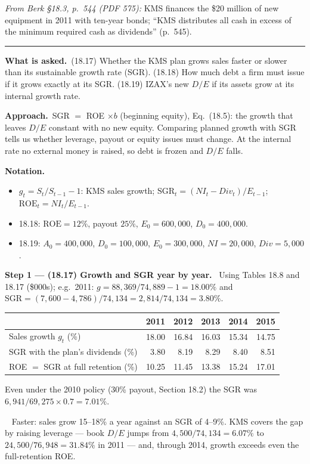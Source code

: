 \documentclass[11pt,a4paper]{article}
\newcommand{\notation}{\par\noindent\textbf{Notation.}}
\newcommand{\step}[2]{\par\medskip\noindent\textbf{Step #1 --- #2.}~}
\newcommand{\asked}{\par\medskip\noindent\textbf{What is asked.}~}
\newcommand{\approach}{\par\smallskip\noindent\textbf{Approach.}~}
\newcommand{\answer}[1]{\par\smallskip\noindent\fbox{\textbf{Answer #1.}}~}
\newcommand{\stmtend}{\par\endgroup\nopagebreak\noindent\rule{\linewidth}{0.4pt}\par\medskip}
\begin{document}
\emph{From Berk §18.3, p.~544 (PDF 575):} KMS finances the \$20 million of new equipment in 2011
with ten-year bonds; ``KMS distributes all cash in excess of the minimum required cash as
dividends'' (p.~545).
\stmtend

\asked (18.17) Whether the KMS plan grows sales faster or slower than its sustainable growth rate (SGR).
(18.18) How much debt a firm must issue if it grows exactly at its SGR. (18.19) IZAX's new $D/E$ if its
assets grow at its internal growth rate.

\approach SGR $=$ ROE $\times b$ (beginning equity), Eq.~(18.5): the growth that leaves $D/E$ constant
with no new equity. Comparing planned growth with SGR tells us whether leverage, payout or equity issues
must change. At the internal rate no external money is raised, so debt is frozen and $D/E$ falls.

\notation
\begin{itemize}
  \item $g_t=S_t/S_{t-1}-1$: KMS sales growth; $\text{SGR}_t=(NI_t-Div_t)/E_{t-1}$; $\text{ROE}_t=NI_t/E_{t-1}$.
  \item 18.18: $\text{ROE}=12\%$, payout $25\%$, $E_0=600{,}000$, $D_0=400{,}000$.
  \item 18.19: $A_0=400{,}000$, $D_0=100{,}000$, $E_0=300{,}000$, $NI=20{,}000$, $Div=5{,}000$.
\end{itemize}

\step{1}{(18.17) Growth and SGR year by year} Using Tables 18.8 and 18.17 (\$000s); e.g.\ 2011:
$g=88{,}369/74{,}889-1=18.00\%$ and $\text{SGR}=(7{,}600-4{,}786)/74{,}134=2{,}814/74{,}134=3.80\%$.
\begin{center}\small
\begin{tabular}{lrrrrr}
\toprule
 & 2011 & 2012 & 2013 & 2014 & 2015\\
\midrule
Sales growth $g_t$ (\%) & 18.00 & 16.84 & 16.03 & 15.34 & 14.75\\
SGR with the plan's dividends (\%) & 3.80 & 8.19 & 8.29 & 8.40 & 8.51\\
ROE $=$ SGR at full retention (\%) & 10.25 & 11.45 & 13.38 & 15.24 & 17.01\\
\bottomrule
\end{tabular}
\end{center}
Even under the 2010 policy (30\% payout, Section 18.2) the SGR was $6{,}941/69{,}275\times0.7=7.01\%$.
\answer{(18.17)} Faster: sales grow 15--18\% a year against an SGR of 4--9\%. KMS covers the gap by
raising leverage --- book $D/E$ jumps from $4{,}500/74{,}134=6.07\%$ to $24{,}500/76{,}948=31.84\%$ in 2011 ---
and, through 2014, growth exceeds even the full-retention ROE.
\end{document}
